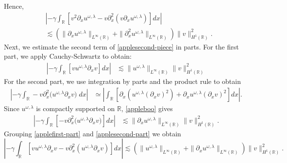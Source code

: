 \documentclass[12pt,reqno]{amsart}
\newcommand{\rr}{\mathbb{R}}
\newcommand{\p}{\partial}
\theoremstyle{plain}  %
\theoremstyle{definition}
\begin{document}
Hence,
\begin{equation}
	\label{applepart1}
	\begin{split}
		& \left | - \gamma \int_{\rr} \left[ v^2 \p_x u^{\omega,\lambda} - v\p_x^2 \left( v \p_x u^{\omega,\lambda} \right)
		\right]dx \right |
		 \\
		 &  \lesssim  \left( \|\p_x u^{\omega,\lambda} \|_{L^\infty (\rr)} + \| \p_x^2 u^{\omega,\lambda}
		\|_{L^\infty(\rr)}
		\right)
		\|v \|_{H^1 (\rr)}^2.
	\end{split}
\end{equation}
Next, we estimate the second term of \eqref{applesecond-piece} in parts. For the first part, we apply Cauchy-Schwartz to obtain:
\begin{equation}
	\label{applefirst-part}
	\begin{split}
		\left |  -\gamma \int_{\rr} \left[ v u^{\omega,\lambda} \p_x v \right] dx \right |
		& \lesssim \|u^{\omega,\lambda}\|_{L^\infty(\rr)} \|v\|_{H^1(\rr)}^2
	\end{split}
\end{equation}
For the second part, we use integration by parts and the product rule to
obtain
\begin{equation}
	\label{appleboo}
	\begin{split}
		 \left | -\gamma \int_{\rr} 
		 -v \p_x^2 \big ( u^{\omega,\lambda} \p_x v \big )
		\; dx \right | 
		& \simeq \left | \int_{\rr} \left[ 
		\p_x\left( u^{\omega,\lambda}\left( \p_x v
		\right)^2 \right) + \p_x u^{\omega,\lambda}\left( \p_x v \right)^2
		\right]dx \right |.
	\end{split}
\end{equation}
Since $u^{\omega,\lambda}$ is compactly supported on $\rr$, \eqref{appleboo}
gives
\begin{equation}
	\label{applesecond-part}
	\begin{split}
		 \left | -\gamma \int_{\rr} \left [-v \p_x^2 \big ( u^{\omega,\lambda} \p_x v \big )\right
		] dx \right | 
		& \lesssim \|\p_x u^{\omega,\lambda} \|_{L^\infty(\rr)} \|v \|_{H^1(\rr)}^2.
	\end{split}
\end{equation}
Grouping \eqref{applefirst-part} and \eqref{applesecond-part} we obtain
\begin{equation}
	\label{applepart2}
	\left |  -\gamma \int_{\rr} \left[ v u^{\omega,\lambda} \p_x v - v \p_x^2\left( u^{\omega,\lambda} \p_x v \right)
	\right]dx \right | \lesssim \left( \|u^{\omega,\lambda}\|_{L^\infty(\rr)} + \|\p_x u^{\omega,\lambda}
	\|_{L^\infty(\rr)}
	\right)\|v\|_{H^1(\rr)}^2.
\end{equation}
\end{document}
